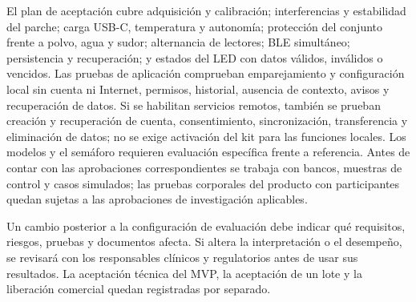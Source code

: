 El plan de aceptación cubre adquisición y calibración; interferencias y estabilidad del parche; carga USB-C, temperatura y autonomía; protección del conjunto frente a polvo, agua y sudor; alternancia de lectores; BLE simultáneo; persistencia y recuperación; y estados del LED con datos válidos, inválidos o vencidos. Las pruebas de aplicación comprueban emparejamiento y configuración local sin cuenta ni Internet, permisos, historial, ausencia de contexto, avisos y recuperación de datos. Si se habilitan servicios remotos, también se prueban creación y recuperación de cuenta, consentimiento, sincronización, transferencia y eliminación de datos; no se exige activación del kit para las funciones locales. Los modelos y el semáforo requieren evaluación específica frente a referencia. Antes de contar con las aprobaciones correspondientes se trabaja con bancos, muestras de control y casos simulados; las pruebas corporales del producto con participantes quedan sujetas a las aprobaciones de investigación aplicables.

Un cambio posterior a la configuración de evaluación debe indicar qué requisitos, riesgos, pruebas y documentos afecta. Si altera la interpretación o el desempeño, se revisará con los responsables clínicos y regulatorios antes de usar sus resultados. La aceptación técnica del MVP, la aceptación de un lote y la liberación comercial quedan registradas por separado.
